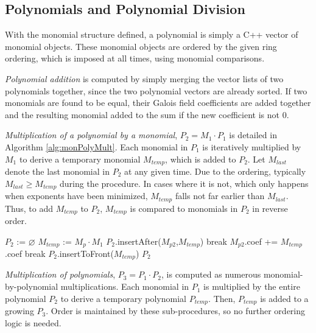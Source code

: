 \subsection{Polynomials and Polynomial Division}
With the monomial structure defined, a polynomial is simply a C++ vector of
monomial objects. These monomial objects are ordered by the given ring ordering,
which is imposed at all times, using monomial comparisons.

{\it Polynomial addition} is computed by simply merging the vector lists of two 
polynomials together, since the two polynomial vectors are already sorted. If two 
monomials are found to be equal, their Galois field coefficients are added 
together and the resulting monomial added to the sum if the new coefficient is 
not $0$.

{\it Multiplication of a polynomial by a monomial}, $P_2 = M_1 \cdot P_1$ is 
detailed in Algorithm \ref{alg:monPolyMult}. Each monomial in $P_1$ is 
iteratively multiplied by $M_1$ to derive a temporary monomial $M_{temp}$, 
which is added to $P_2$. 
Let $M_{last}$ denote the last monomial in $P_2$ at any given time. 
Due to the ordering, typically $M_{last}\geq M_{temp}$ during the procedure.
In cases where it is not, which only happens when exponents have been minimized, 
$M_{temp}$ falls not far earlier than $M_{last}$.
Thus, to add $M_{temp}$ to $P_2$, $M_{temp}$ is compared to monomials in $P_2$ 
in reverse order.
\begin{algorithm}[hbt]
\SetAlgoNoLine

        $P_2$ := $\varnothing$\;
        {
            $M_{temp}$ := $M_p \cdot M_1$\;
            {
                {
                    $P_2$.insertAfter($M_{p2}$,$M_{temp}$)\;
                    break\;
                }
                {
                    $M_{p2}$.coef += $M_{temp}$.coef\;
                    break\;
                }
            }
            {
                $P_2$.insertToFront($M_{temp}$)\;
            }
        }
        \Return $P_2$\;
\caption{Multiplication of a Polynomial by a Monomial}\label{alg:monPolyMult}
\end{algorithm}


{\it Multiplication of polynomials}, $P_3 = P_1 \cdot P_2$, is computed as
numerous monomial-by-polynomial multiplications. Each monomial in $P_1$
is multiplied by the entire polynomial $P_2$ to derive a temporary polynomial
$P_{temp}$. Then, $P_{temp}$ is added to a growing $P_3$. Order is maintained
by these sub-procedures, so no further ordering logic is needed.

